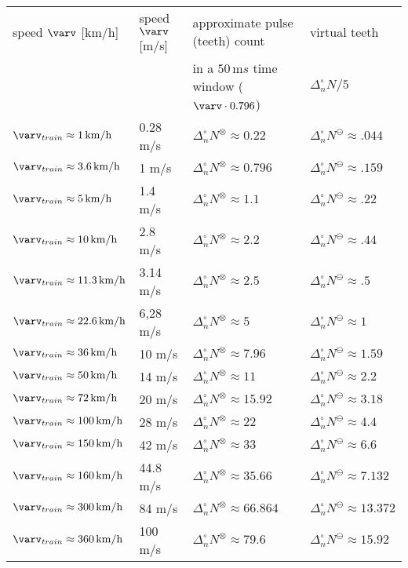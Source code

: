\begin{tabular}{|l|l | l| l|}
\hline
speed $\varv$ [km/h] &speed $\varv$ [m/s]&  approximate pulse (teeth) count & virtual teeth \\ &  & in a $50\,\mathrm{m}s $ time window ($\varv \cdot 0.796$) & $\Delta_n^\circ N/5$\\
\hline
$\varv_{train}\approx 1\, \mathrm{km/h}$ & 0.28 m/s & $\Delta_n^\circ N^\otimes\approx 0.22 $ & $\Delta_n^\circ N^\ominus \approx  .044 $ \\
\hline
$\varv_{train}\approx 3.6\, \mathrm{km/h}$ & 1 m/s & $\Delta_n^\circ N^\otimes\approx 0.796 $ & $\Delta_n^\circ N^\ominus \approx  .159 $\\
\hline
$\varv_{train}\approx 5\, \mathrm{km/h}$ & 1.4 m/s & $\Delta_n^\circ N^\otimes\approx 1.1 $ & $\Delta_n^\circ N^\ominus \approx  .22 $ \\
\hline
$\varv_{train}\approx 10\, \mathrm{km/h}$ & 2.8 m/s & $\Delta_n^\circ N^\otimes\approx 2.2 $ & $\Delta_n^\circ N^\ominus \approx  .44 $ \\
\hline
$\varv_{train}\approx 11.3\, \mathrm{km/h}$ & 3.14 m/s & $\Delta_n^\circ N^\otimes\approx 2.5 $ & $\Delta_n^\circ N^\ominus \approx  .5$ \\
\hline
{$\varv_{train}\approx 22.6 \,\mathrm{km/h}$} & 6,28 m/s &
{ $\Delta_n^\circ N^\otimes\approx 5 $} & $\Delta_n^\circ N^\ominus \approx  1 $\\
\hline
$\varv_{train}\approx 36\, \mathrm{km/h}$ & 10 m/s & $\Delta_n^\circ N^\otimes\approx 7.96 $ & $\Delta_n^\circ N^\ominus \approx  1.59 $\\
\hline
$\varv_{train}\approx 50\, \mathrm{km/h}$ & 14 m/s & $\Delta_n^\circ N^\otimes\approx 11 $ & $\Delta_n^\circ N^\ominus \approx  2.2$ \\
\hline
$\varv_{train}\approx 72 \,\mathrm{km/h}$ & 20 m/s & $\Delta_n^\circ N^\otimes\approx 15.92 $ & $\Delta_n^\circ N^\ominus \approx  3.18$\\
\hline
$\varv_{train}\approx 100 \,\mathrm{km/h}$ & 28 m/s & $\Delta_n^\circ N^\otimes\approx 22 $ & $\Delta_n^\circ N^\ominus \approx  4.4 $\\
\hline  
$\varv_{train} \approx 150\, \mathrm{km/h}$ & 42 m/s & $\Delta_n^\circ N^\otimes\approx 33 $ & $\Delta_n^\circ N^\ominus \approx  6.6 $\\
\hline
$\varv_{train}\approx 160 \,\mathrm{km/h}$ & 44.8 m/s & $\Delta_n^\circ N^\otimes\approx 35.66 $ & $\Delta_n^\circ N^\ominus \approx  7.132$ \\
\hline
$\varv_{train}\approx 300\, \mathrm{km/h}$ & 84 m/s & $\Delta_n^\circ N^\otimes\approx 66.864 $ & $\Delta_n^\circ N^\ominus \approx  13.372 $\\
\hline
$\varv_{train}\approx 360\, \mathrm{km/h}$ & 100 m/s & $\Delta_n^\circ N^\otimes\approx 79.6 $ & $\Delta_n^\circ N^\ominus \approx  15.92 $\\
\hline
\end{tabular}

